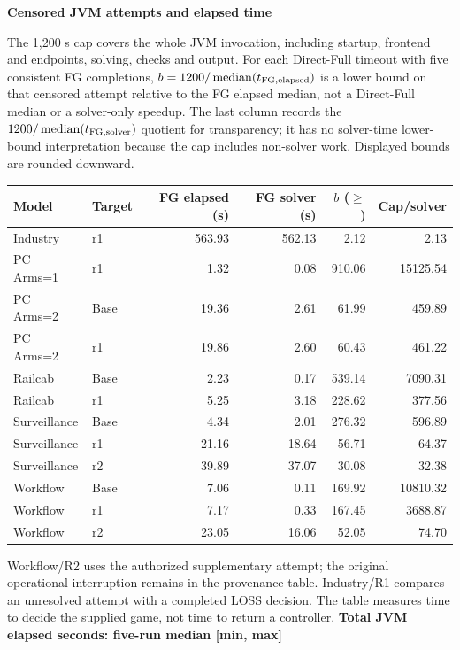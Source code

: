 \clearpage\noindent\textbf{Censored JVM attempts and elapsed time}\par
The 1,200 s cap covers the whole JVM invocation, including startup, frontend and endpoints, solving, checks and output. For each Direct-Full timeout with five consistent FG completions, $b=1200/\operatorname{median}(t_{\rm FG,elapsed})$ is a lower bound on that censored attempt relative to the FG elapsed median, not a Direct-Full median or a solver-only speedup. The last column records the $1200/\operatorname{median}(t_{\rm FG,solver})$ quotient for transparency; it has no solver-time lower-bound interpretation because the cap includes non-solver work. Displayed bounds are rounded downward.
\begin{longtable}{@{}llrrrr@{}}\toprule
Model & Target & FG elapsed (s) & FG solver (s) & $b$ ($\geq$) & Cap/solver\\\midrule\endhead
Industry & r1 & 563.93 & 562.13 & 2.12 & 2.13\\
PC Arms=1 & r1 & 1.32 & 0.08 & 910.06 & 15125.54\\
PC Arms=2 & Base & 19.36 & 2.61 & 61.99 & 459.89\\
PC Arms=2 & r1 & 19.86 & 2.60 & 60.43 & 461.22\\
Railcab & Base & 2.23 & 0.17 & 539.14 & 7090.31\\
Railcab & r1 & 5.25 & 3.18 & 228.62 & 377.56\\
Surveillance & Base & 4.34 & 2.01 & 276.32 & 596.89\\
Surveillance & r1 & 21.16 & 18.64 & 56.71 & 64.37\\
Surveillance & r2 & 39.89 & 37.07 & 30.08 & 32.38\\
Workflow & Base & 7.06 & 0.11 & 169.92 & 10810.32\\
Workflow & r1 & 7.17 & 0.33 & 167.45 & 3688.87\\
Workflow & r2 & 23.05 & 16.06 & 52.05 & 74.70\\
\bottomrule\end{longtable}
Workflow/R2 uses the authorized supplementary attempt; the original operational interruption remains in the provenance table. Industry/R1 compares an unresolved attempt with a completed LOSS decision. The table measures time to decide the supplied game, not time to return a controller.
\clearpage\noindent\textbf{Total JVM elapsed seconds: five-run median [min, max]}\par
\begingroup\scriptsize\setlength{\tabcolsep}{3pt}
